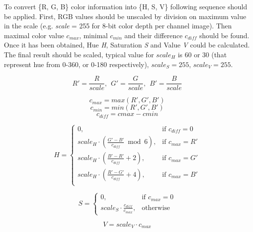 \documentclass{ctuthesis}
\begin{document}
To convert \{R, G, B\} color information into \{H, S, V\} following sequence should be applied. First, RGB values should be unscaled by division on maximum value in the scale (e.g. \emph {scale} = 255 for 8-bit color depth per channel image). Then maximal color value $c_{max}$, minimal $c_{min}$ and their difference $c_{diff}$ should be found. Once it has been obtained, Hue \emph{H}, Saturation \emph{S} and Value \emph{V} could be calculated. The final result should be scaled, typical value for $scale_H$ is 60 or 30 (that represent hue from 0-360, or 0-180 respectively), $scale_S=255$, $scale_V=255$.

\[ R' = \frac{R}{scale},\ \ G' = \frac{G}{scale},\ \ B' = \frac{B}{scale} \]

\[ c_{max} = max(R', G', B') \]
\[ c_{min} = min(R', G', B') \]
\[ c_{diff} = cmax - cmin \]

\[
    H= 
\begin{cases}
    0,& \text{if } c_{diff} = 0\\
    scale_H \cdot (\frac{G' - B'}{c_{diff}} \bmod 6), & \text{if } c_{max} = R'\\
    scale_H \cdot (\frac{B' - R'}{c_{diff}} + 2), & \text{if } c_{max} = G'\\
    scale_H \cdot (\frac{R' - G'}{c_{diff}} + 4), & \text{if } c_{max} = B'\\
\end{cases}
\]

\[
    S= 
\begin{cases}
    0,& \text{if } c_{max} = 0\\
    scale_S \cdot \frac{c_{diff}}{c_{max}}  ,              & \text{otherwise}
\end{cases}
\]

\[ V = scale_V \cdot c_{max}  \]
\end{document}
